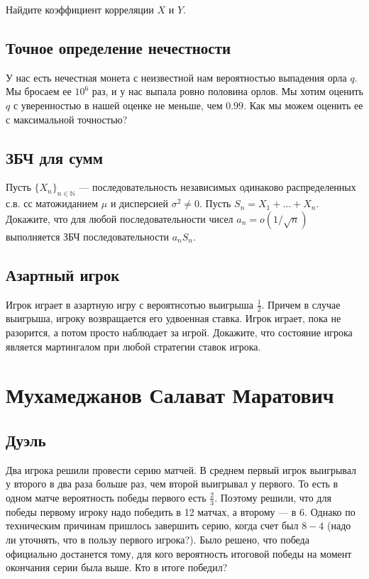 \documentclass[12pt]{article}
\newcommand\N{\mathbb{N}}
\begin{document}
Найдите коэффициент корреляции $X$ и $Y$.



\subsection{Точное определение нечестности}

У нас есть нечестная монета с неизвестной нам вероятностью выпадения орла $q$. Мы бросаем ее $10^6$ раз, и у нас выпала ровно половина орлов. Мы хотим оценить $q$ с уверенностью в нашей оценке не меньше, чем $0.99$. Как мы можем оценить ее с максимальной точностью? 



\subsection{ЗБЧ для сумм}
Пусть $\{X_n\}_{n \in \N}$ --- последовательность независимых одинаково распределенных с.в. сс матожиданием $\mu$ и дисперсией $\sigma^2 \ne 0$. Пусть $S_n = X_1 + \dots + X_n$. Докажите, что для любой последовательности чисел $a_n = o(1/\sqrt{n})$ выполняется ЗБЧ последовательности $a_n S_n$.



\subsection{Азартный игрок}

Игрок играет в азартную игру с вероятнсотью выигрыша $\frac{1}{2}$. Причем в случае выигрыша, игроку возвращается его удвоенная ставка. Игрок играет, пока не разорится, а потом просто наблюдает за игрой. Докажите, что состояние игрока является мартингалом при любой стратегии ставок игрока.



\newpage
\section{Мухамеджанов Салават Маратович}

\subsection{Дуэль}

Два игрока решили провести серию матчей. В среднем первый игрок выигрывал у второго в два раза больше раз, чем второй выигрывал у первого. То есть в одном матче вероятность победы первого есть $\frac{2}{3}$. Поэтому решили, что для победы первому игроку надо победить в 12 матчах, а второму --- в 6. Однако по техническим причинам пришлось завершить серию, когда счет был $8-4$ (надо ли уточнять, что в пользу первого игрока?). Было решено, что победа официально достанется тому, для кого вероятность итоговой победы на момент окончания серии была выше. Кто в итоге победил?
\end{document}
